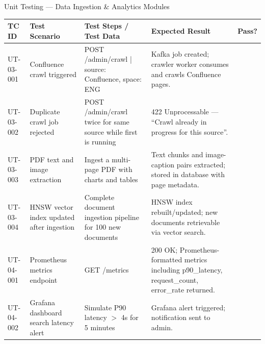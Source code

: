 \documentclass[aspectratio=169,xcolor=dvipsnames]{beamer}
\newcommand{\cmark}{\checkmark}
\newcommand{\tw}{\textwidth}
\begin{document}
\begin{frame}{Unit Testing — Data Ingestion \& Analytics Modules}
  \tiny\renewcommand{\arraystretch}{0.88}
  \begin{table}
    \centering
    \setlength{\tabcolsep}{2pt}
    \begin{tabular}{p{.09\tw}|p{.15\tw}|p{.44\tw}|p{.18\tw}|p{.07\tw}}
      \toprule
      \textbf{TC ID} & \textbf{Test Scenario} & \textbf{Test Steps / Test Data} & \textbf{Expected Result} & \textbf{Pass?}\\
      \midrule
      UT-03-001 & Confluence crawl triggered &
        POST /admin/crawl | source: Confluence, space: ENG &
        Kafka job created; crawler worker consumes and crawls Confluence pages. & \textcolor{green!60!black}{\cmark}\\
      \midrule
      UT-03-002 & Duplicate crawl job rejected &
        POST /admin/crawl twice for same source while first is running &
        422 Unprocessable — ``Crawl already in progress for this source''. & \textcolor{green!60!black}{\cmark}\\
      \midrule
      UT-03-003 & PDF text and image extraction &
        Ingest a multi-page PDF with charts and tables &
        Text chunks and image-caption pairs extracted; stored in database with page metadata. & \textcolor{green!60!black}{\cmark}\\
      \midrule
      UT-03-004 & HNSW vector index updated after ingestion &
        Complete document ingestion pipeline for 100 new documents &
        HNSW index rebuilt/updated; new documents retrievable via vector search. & \textcolor{green!60!black}{\cmark}\\
      \midrule
      UT-04-001 & Prometheus metrics endpoint &
        GET /metrics &
        200 OK; Prometheus-formatted metrics including p90\_latency, request\_count, error\_rate returned. & \textcolor{green!60!black}{\cmark}\\
      \midrule
      UT-04-002 & Grafana dashboard search latency alert &
        Simulate P90 latency $>$ 4s for 5 minutes &
        Grafana alert triggered; notification sent to admin. & \textcolor{green!60!black}{\cmark}\\
      \bottomrule
    \end{tabular}
  \end{table}
\end{frame}
\end{document}
